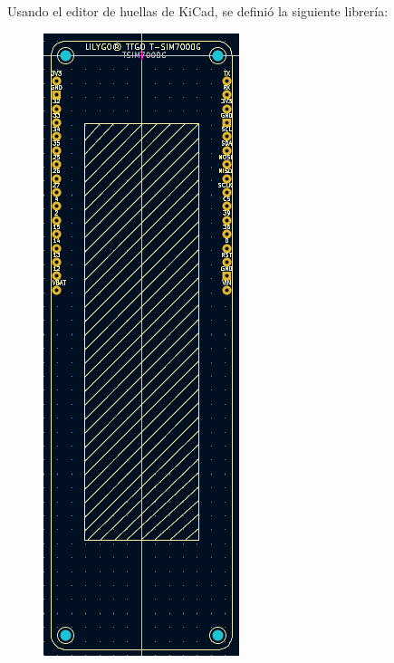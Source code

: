 Usando el editor de huellas de KiCad, se definió la siguiente librería:

\begin{figure}[H]
  \centering
  \begin{minipage}{.4\linewidth}
    \includegraphics[width=\linewidth]{images/tsim-footprint.png}

\end{minipage}
\end{figure}
